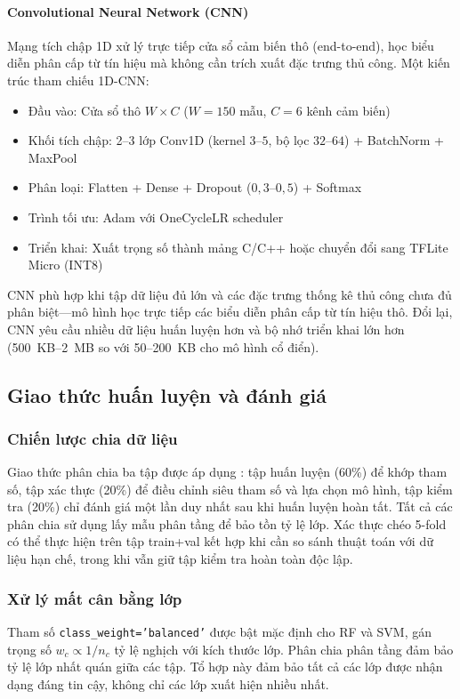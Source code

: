 \paragraph{Convolutional Neural Network (CNN)}
Mạng tích chập 1D xử lý trực tiếp cửa sổ cảm biến thô (end-to-end), học biểu diễn phân cấp từ tín hiệu mà không cần trích xuất đặc trưng thủ công. Một kiến trúc tham chiếu 1D-CNN:
\begin{itemize}
    \item Đầu vào: Cửa sổ thô $W \times C$ ($W=150$ mẫu, $C=6$ kênh cảm biến)
    \item Khối tích chập: 2--3 lớp Conv1D (kernel $3$--$5$, bộ lọc $32$--$64$) + BatchNorm + MaxPool
    \item Phân loại: Flatten + Dense + Dropout ($0{,}3$--$0{,}5$) + Softmax
    \item Trình tối ưu: Adam với OneCycleLR scheduler
    \item Triển khai: Xuất trọng số thành mảng C/C++ hoặc chuyển đổi sang TFLite Micro (INT8)
\end{itemize}
CNN phù hợp khi tập dữ liệu đủ lớn và các đặc trưng thống kê thủ công chưa đủ phân biệt---mô hình học trực tiếp các biểu diễn phân cấp từ tín hiệu thô. Đổi lại, CNN yêu cầu nhiều dữ liệu huấn luyện hơn và bộ nhớ triển khai lớn hơn (500~KB--2~MB so với 50--200~KB cho mô hình cổ điển).

\subsection{Giao thức huấn luyện và đánh giá}

\subsubsection{Chiến lược chia dữ liệu}
Giao thức phân chia ba tập được áp dụng \cite{goodfellow2016deep}: tập huấn luyện (60\%) để khớp tham số, tập xác thực (20\%) để điều chỉnh siêu tham số và lựa chọn mô hình, tập kiểm tra (20\%) chỉ đánh giá một lần duy nhất sau khi huấn luyện hoàn tất. Tất cả các phân chia sử dụng lấy mẫu phân tầng để bảo tồn tỷ lệ lớp. Xác thực chéo 5-fold có thể thực hiện trên tập train+val kết hợp khi cần so sánh thuật toán với dữ liệu hạn chế, trong khi vẫn giữ tập kiểm tra hoàn toàn độc lập.

\subsubsection{Xử lý mất cân bằng lớp}
Tham số \texttt{class\_weight='balanced'} được bật mặc định cho RF và SVM, gán trọng số $w_c \propto 1/n_c$ tỷ lệ nghịch với kích thước lớp. Phân chia phân tầng đảm bảo tỷ lệ lớp nhất quán giữa các tập. Tổ hợp này đảm bảo tất cả các lớp được nhận dạng đáng tin cậy, không chỉ các lớp xuất hiện nhiều nhất.

